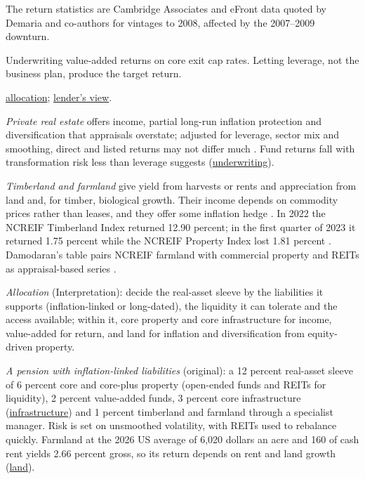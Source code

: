 \begin{qfmethod}
 The return statistics are Cambridge Associates and eFront data quoted by Demaria and co-authors for vintages to 2008, affected by the 2007--2009 downturn.

 Underwriting value-added returns on core exit cap rates. Letting leverage, not the business plan, produce the target return.

 \hyperref[meth:real-assets-allocation]{allocation}; \hyperref[meth:private-debt-credit-analysis]{lender's view}.

\end{qfmethod}

\begin{qfmethod}\label{meth:real-assets-allocation}
 \emph{Private real estate} offers income, partial long-run inflation protection and diversification that appraisals overstate; adjusted for leverage, sector mix and smoothing, direct and listed returns may not differ much \citep[pp.~376--381]{s7-ang}. Fund returns fall with transformation risk less than leverage suggests (\hyperref[meth:private-real-estate-underwriting]{underwriting}).

\emph{Timberland and farmland} give yield from harvests or rents and appreciation from land and, for timber, biological growth. Their income depends on commodity prices rather than leases, and they offer some inflation hedge \citep[p.~143]{demaria-private-markets-2021}. In 2022 the NCREIF Timberland Index returned 12.90 percent; in the first quarter of 2023 it returned 1.75 percent while the NCREIF Property Index lost 1.81 percent \citep[p.~28]{ncreif-timberland-2023q1}. Damodaran's table pairs NCREIF farmland with commercial property and REITs as appraisal-based series \citep[p.~743, Table~26.1]{investment-valuation-2012}.

\emph{Allocation} (Interpretation): decide the real-asset sleeve by the liabilities it supports (inflation-linked or long-dated), the liquidity it can tolerate and the access available; within it, core property and core infrastructure for income, value-added for return, and land for inflation and diversification from equity-driven property.

 \emph{A pension with inflation-linked liabilities} (original): a 12 percent real-asset sleeve of 6 percent core and core-plus property (open-ended funds and REITs for liquidity), 2 percent value-added funds, 3 percent core infrastructure (\hyperref[meth:infrastructure-allocation]{infrastructure}) and 1 percent timberland and farmland through a specialist manager. Risk is set on unsmoothed volatility, with REITs used to rebalance quickly. Farmland at the 2026 US average of 6,020 dollars an acre and 160 of cash rent yields 2.66 percent gross, so its return depends on rent and land growth (\hyperref[meth:land-timber-farmland]{land}).


\end{qfmethod}
